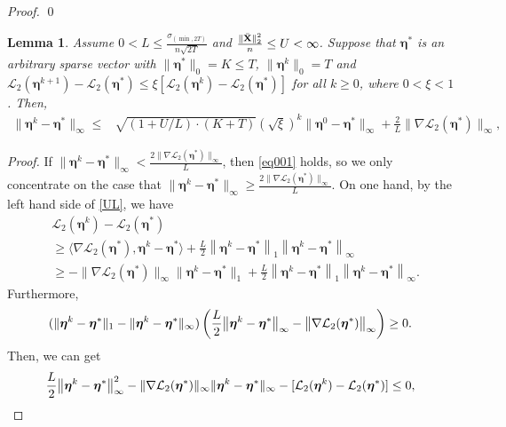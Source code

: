 \documentclass[12pt]{article}
\newtheorem{lemma}{Lemma}
\newcommand{\bX}{{\bf X}}
\newcommand{\boldeta}{\boldsymbol{\eta}}
\begin{document}
\begin{appendix}
\begin{proof}
\qed
\end{proof}
\begin{lemma}\label{L9.3}
Assume
$0<L\leq\frac{\sigma_{(\min,2T)}}{n\sqrt{2T}}$ and $\frac{\|\bar{\bX}\|_2^2}{n}\leq U<\infty$.
Suppose that $\boldeta^{*}$ is an arbitrary sparse vector with $\|\boldeta^{*}\|_{0}=K\leq T$, $\|\boldeta^k\|_{0}=T$ and $\mathcal{L}_2(\boldeta^{k+1})-\mathcal{L}_2(\boldeta^{*})\leq \xi[\mathcal{L}_2(\boldeta^{k})-\mathcal{L}_2(\boldeta^{*})]$ for all $k\geq0$,  where $0<\xi<1$. Then,
\begin{equation}\label{eq001}
\begin{split}
\|\boldeta^{k}-\boldeta^{*}\|_{\infty}\leq&
\sqrt{(1+U/L)\cdot(K+T)}(\sqrt{\xi})^k\|\boldeta^0-\boldeta^{*}\|_{\infty}+\frac{2}{L}\|\nabla \mathcal{L}_2(\boldeta^{*})\|_{\infty},
\end{split}
\end{equation}
\end{lemma}
\begin{proof}
If $\|\boldeta^k-\boldeta^*\|_{\infty}< \frac{2\|\nabla \mathcal{L}_2(\boldeta^*)\|_{\infty}}{L}$, then \eqref{eq001} holds, so we only concentrate on the case that $\|\boldeta^k-\boldeta^*\|_{\infty}\geq \frac{2\|\nabla
\mathcal{L}_2(\boldeta^*)\|_{\infty}}{L}$.
On one hand,
by the left hand side of \eqref{UL},
we have
{
\begin{equation*}
\begin{split}
&\mathcal{L}_2(\boldeta^{k})-\mathcal{L}_2(\boldeta^{*})\\
&\geq\langle\nabla \mathcal{L}_2(\boldeta^*),\boldeta^{k}-\boldeta^{*}\rangle+\frac{L}{2}\left\|\boldeta^{k}-\boldeta^{*}\right\|_1\left\|\boldeta^{k}-\boldeta^{*}\right\|_{\infty}\\
&\geq-\|\nabla \mathcal{L}_2(\boldeta^{*})\|_{\infty}\|\boldeta^{k}-\boldeta^{*}\|_1+\frac{L}{2}\left\|\boldeta^{k}-\boldeta^{*}\right\|_1\left\|\boldeta^{k}-\boldeta^{*}\right\|_{\infty}.
\end{split}
\end{equation*}
}
Furthermore,
{
\begin{equation*}
(\|\boldeta^k-\boldeta^*\|_1-\|\boldeta^k-\boldeta^*\|_{\infty})\left(\frac{L}{2}\big{\|}\boldeta^k-\boldeta^*\big{\|}_{\infty}-\big{\|}\nabla \mathcal{L}_2(\boldeta^*)\big{\|}_{\infty}\right)\geq 0.
\end{equation*}
}
 Then, we can get
{
\begin{equation*}
\frac{L}{2}\big{\|}\boldeta^k-\boldeta^*\big{\|}_{\infty}^2-\|\nabla \mathcal{L}_2(\boldeta^*)\|_{\infty}\|\boldeta^k-\boldeta^*\|_{\infty}-[\mathcal{L}_2(\boldeta^k)-\mathcal{L}_2(\boldeta^*)]\leq0,

\end{equation*}}
\end{proof}
\end{appendix}
\end{document}
